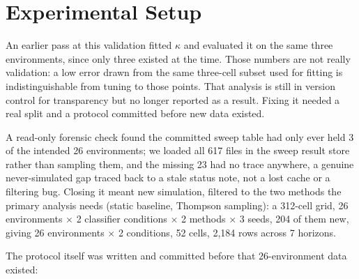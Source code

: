 \documentclass[conference]{IEEEtran}
\begin{document}
\section{Experimental Setup}
\label{sec:setup}

An earlier pass at this validation fitted $\kappa$ and evaluated it on
the same three environments, since only three existed at the time. Those
numbers are not really validation: a low error drawn from the same
three-cell subset used for fitting is indistinguishable from tuning to
those points. That analysis is still in version control for transparency
but no longer reported as a result. Fixing it needed a real split and a
protocol committed before new data existed.

A read-only forensic check found the committed sweep table had only ever
held 3 of the intended 26 environments; we loaded all 617 files in the
sweep result store rather than sampling them, and the missing 23 had no
trace anywhere, a genuine never-simulated gap traced back to a stale
status note, not a lost cache or a filtering bug. Closing it meant new
simulation, filtered to the two methods the primary analysis needs
(static baseline, Thompson sampling): a 312-cell grid, 26 environments
$\times$ 2 classifier conditions $\times$ 2 methods $\times$ 3 seeds, 204
of them new, giving 26 environments $\times$ 2 conditions, 52 cells,
2{,}184 rows across 7 horizons.

The protocol itself was written and committed before that 26-environment
data existed:
\end{document}
